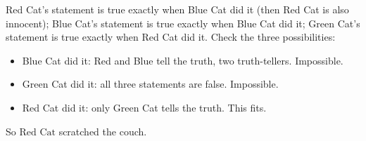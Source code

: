Red Cat's statement is true exactly when Blue Cat did it (then Red Cat is also innocent); Blue Cat's statement is true exactly when Blue Cat did it; Green Cat's statement is true exactly when Red Cat did it. Check the three possibilities:
\begin{itemize}
\item Blue Cat did it: Red and Blue tell the truth, two truth-tellers. Impossible.
\item Green Cat did it: all three statements are false. Impossible.
\item Red Cat did it: only Green Cat tells the truth. This fits.
\end{itemize}
So $\boxed{\text{Red Cat}}$ scratched the couch.
